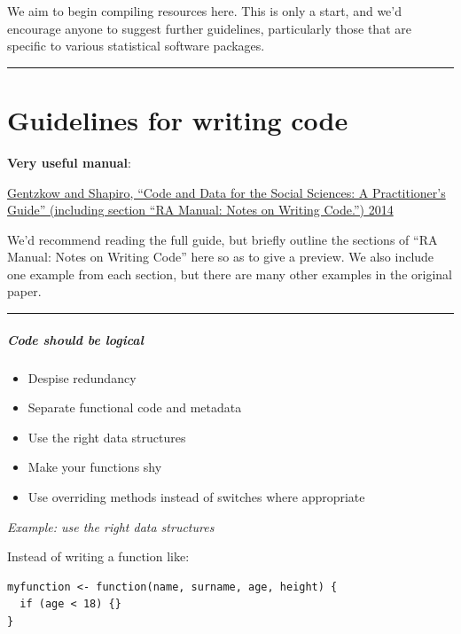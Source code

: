 \documentclass[
]{book}
\providecommand{\tightlist}{%
  \setlength{\itemsep}{0pt}\setlength{\parskip}{0pt}}
\theoremstyle{definition}
\theoremstyle{definition}
\theoremstyle{definition}
\theoremstyle{definition}
\theoremstyle{remark}
\begin{document}
We aim to begin compiling resources here. This is only a start, and we'd encourage anyone to suggest further guidelines, particularly those that are specific to various statistical software packages.

\begin{center}\rule{0.5\linewidth}{0.5pt}\end{center}

\hypertarget{guidelines-for-writing-code}{%
\section{Guidelines for writing code}\label{guidelines-for-writing-code}}

\textbf{Very useful manual}:

\href{http://web.stanford.edu/~gentzkow/research/CodeAndData.pdf}{Gentzkow and Shapiro, ``Code and Data for the Social Sciences: A Practitioner's Guide'' (including section ``RA Manual: Notes on Writing Code.'') 2014}

We'd recommend reading the full guide, but briefly outline the sections of ``RA Manual: Notes on Writing Code'' here so as to give a preview. We also include one example from each section, but there are many other examples in the original paper.

\begin{center}\rule{0.5\linewidth}{0.5pt}\end{center}

\hypertarget{code-should-be-logical}{%
\subparagraph{Code should be logical}\label{code-should-be-logical}}

\begin{itemize}
\tightlist
\item
  Despise redundancy
\item
  Separate functional code and metadata
\item
  Use the right data structures
\item
  Make your functions shy
\item
  Use overriding methods instead of switches where appropriate
\end{itemize}

\emph{Example: use the right data structures}

Instead of writing a function like:

\begin{verbatim}
myfunction <- function(name, surname, age, height) {
  if (age < 18) {}
}
\end{verbatim}
\end{document}
